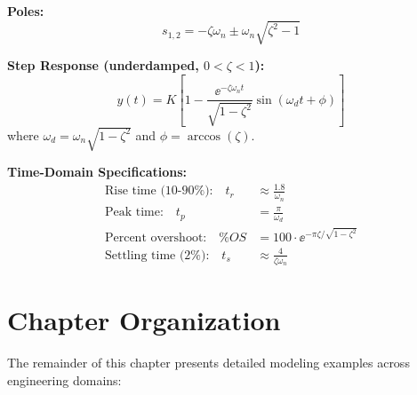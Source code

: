 \textbf{Poles:}
\begin{equation}
s_{1,2} = -\zeta\omega_n \pm \omega_n\sqrt{\zeta^2 - 1}
\end{equation}

\textbf{Step Response (underdamped, $0 < \zeta < 1$):}
\begin{equation}
y(t) = K\left[1 - \frac{\ee^{-\zeta\omega_n t}}{\sqrt{1-\zeta^2}}\sin(\omega_d t + \phi)\right]
\end{equation}
where $\omega_d = \omega_n\sqrt{1-\zeta^2}$ and $\phi = \arccos(\zeta)$.

\textbf{Time-Domain Specifications:}
\begin{align}
\text{Rise time (10-90\%):} \quad t_r &\approx \frac{1.8}{\omega_n} \\
\text{Peak time:} \quad t_p &= \frac{\pi}{\omega_d} \\
\text{Percent overshoot:} \quad \%OS &= 100 \cdot \ee^{-\pi\zeta/\sqrt{1-\zeta^2}} \\
\text{Settling time (2\%):} \quad t_s &\approx \frac{4}{\zeta\omega_n}
\end{align}

\chapter{Chapter Organization}
\label{ch:chapter_organization}

The remainder of this chapter presents detailed modeling examples across engineering domains:

